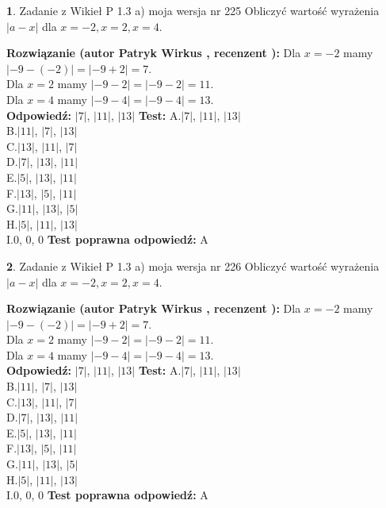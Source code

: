 \documentclass[12pt, a4paper]{article}
\theoremstyle{definition} %
\newtheorem{zad}{}
\newcommand{\zadStart}[1]{\begin{zad}#1\newline}
\newcommand{\zadStop}{\end{zad}}
\newcommand{\rozwStart}[2]{\noindent \textbf{Rozwiązanie (autor #1 , recenzent #2): }\newline}
\newcommand{\rozwStop}{\newline}
\newcommand{\odpStart}{\noindent \textbf{Odpowiedź:}\newline}
\newcommand{\odpStop}{\newline}
\newcommand{\testStart}{\noindent \textbf{Test:}\newline}
\newcommand{\testStop}{\newline}
\newcommand{\kluczStart}{\noindent \textbf{Test poprawna odpowiedź:}\newline}
\newcommand{\kluczStop}{\newline}
\begin{document}
\zadStart{Zadanie z Wikieł P 1.3 a) moja wersja nr 225}
Obliczyć wartość wyrażenia $|a - x|$ dla $x=-2,x=2,x=4$.
\zadStop
\rozwStart{Patryk Wirkus}{}
Dla $x = -2$ mamy $|-9 - (-2)| = |-9 + 2| = 7$.\\
Dla $x = 2$ mamy $|-9 - 2| = |-9 - 2| = 11$.\\
Dla $x = 4$ mamy $|-9 - 4| = |-9 - 4| = 13$.\\
\rozwStop
\odpStart
$|7|$, $|11|$, $|13|$
\odpStop
\testStart
A.$|7|$, $|11|$, $|13|$\\
B.$|11|$, $|7|$, $|13|$\\
C.$|13|$, $|11|$, $|7|$\\
D.$|7|$, $|13|$, $|11|$\\
E.$|5|$, $|13|$, $|11|$\\
F.$|13|$, $|5|$, $|11|$\\
G.$|11|$, $|13|$, $|5|$\\
H.$|5|$, $|11|$, $|13|$\\
I.$0$, $0$, $0$
\testStop
\kluczStart
A
\kluczStop



\zadStart{Zadanie z Wikieł P 1.3 a) moja wersja nr 226}
Obliczyć wartość wyrażenia $|a - x|$ dla $x=-2,x=2,x=4$.
\zadStop
\rozwStart{Patryk Wirkus}{}
Dla $x = -2$ mamy $|-9 - (-2)| = |-9 + 2| = 7$.\\
Dla $x = 2$ mamy $|-9 - 2| = |-9 - 2| = 11$.\\
Dla $x = 4$ mamy $|-9 - 4| = |-9 - 4| = 13$.\\
\rozwStop
\odpStart
$|7|$, $|11|$, $|13|$
\odpStop
\testStart
A.$|7|$, $|11|$, $|13|$\\
B.$|11|$, $|7|$, $|13|$\\
C.$|13|$, $|11|$, $|7|$\\
D.$|7|$, $|13|$, $|11|$\\
E.$|5|$, $|13|$, $|11|$\\
F.$|13|$, $|5|$, $|11|$\\
G.$|11|$, $|13|$, $|5|$\\
H.$|5|$, $|11|$, $|13|$\\
I.$0$, $0$, $0$
\testStop
\kluczStart
A
\kluczStop
\end{document}
